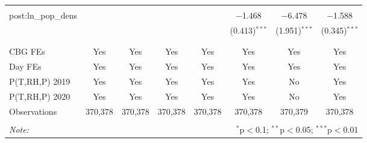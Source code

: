 \begin{table}[!htbp]
\begin{tabular}{@{\extracolsep{5pt}}lccccccc}
  & & & & & & & \\ 
 post:ln\_pop\_dens &  &  &  &  & $-$1.468 & $-$6.478 & $-$1.588 \\ 
  &  &  &  &  & (0.413)$^{***}$ & (1.951)$^{***}$ & (0.345)$^{***}$ \\ 
  & & & & & & & \\ 
\hline \\[-1.8ex] 
CBG FEs & Yes & Yes & Yes & Yes & Yes & Yes & Yes \\ 
Day FEs & Yes & Yes & Yes & Yes & Yes & Yes & Yes \\ 
P(T,RH,P) 2019 & Yes & Yes & Yes & Yes & Yes & No & Yes \\ 
P(T,RH,P) 2020 & Yes & Yes & Yes & Yes & Yes & No & Yes \\ 
Observations & 370,378 & 370,378 & 370,378 & 370,378 & 370,378 & 370,379 & 370,378 \\ 
\hline 
\hline \\[-1.8ex] 
\textit{Note:}  & \multicolumn{7}{r}{$^{*}$p$<$0.1; $^{**}$p$<$0.05; $^{***}$p$<$0.01} \\ 
\end{tabular} 
\end{table} 
